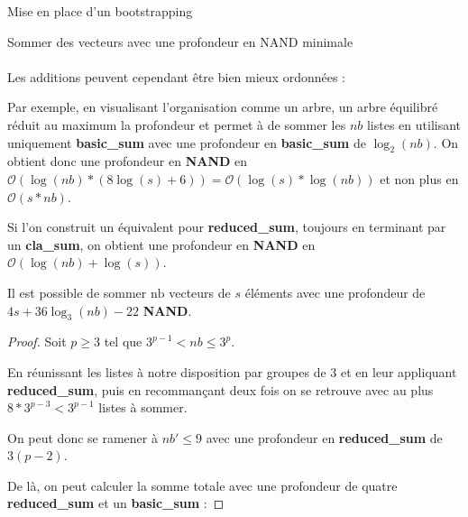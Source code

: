 \begin{section}{Mise en place d'un bootstrapping}
\begin{subsection}{Sommer des vecteurs avec une profondeur en NAND minimale}
\paragraph{}
	Les additions peuvent cependant être bien mieux ordonnées :
	
	Par exemple, en visualisant l'organisation comme un arbre, un arbre
	équilibré réduit au maximum la profondeur et permet à de sommer les
	$nb$ listes en utilisant uniquement \textbf{basic\_sum} avec une
	profondeur en \textbf{basic\_sum} de $\log_2(nb)$. On obtient donc une
	profondeur en \textbf{NAND} en $\mathcal{O}(\log(nb) * (8\log(s) + 6))
	= \mathcal{O}(\log(s) * \log(nb))$ et non plus en $\mathcal{O}(s * nb)$.

	Si l'on construit un équivalent pour \textbf{reduced\_sum}, toujours en
	terminant par un \textbf{cla\_sum}, on obtient une profondeur en
	\textbf{NAND} en $\mathcal{O}(\log(nb) + \log(s))$.

\begin{prop}
	Il est possible de sommer $\text{nb}$ vecteurs de $s$ éléments avec une profondeur de $4s + 36\log_3(nb) -22$ \textbf{NAND}.
\end{prop}

\begin{proof}
	Soit $p \geqslant 3$ tel que $3^{p-1} < nb \leqslant 3^{p}$.
	
	En réunissant les listes à notre disposition par groupes de 3 et en leur appliquant \textbf{reduced\_sum}, puis en recommançant deux fois on se retrouve avec au plus $8 * 3^{p-3} < 3^{p-1}$ listes à sommer.
	
	On peut donc se ramener à $nb' \leqslant 9$ avec une profondeur en \textbf{reduced\_sum} de $3(p - 2)$.
	
	De là, on peut calculer la somme totale avec une profondeur de quatre \textbf{reduced\_sum} et un \textbf{basic\_sum} :

\center
{}
\end{proof}
\end{subsection}
\end{section}

